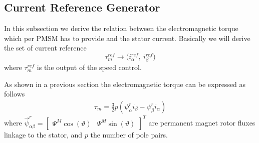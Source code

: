 \documentclass[11pt,a4paper]{scrartcl}
\numberwithin{equation}{section}
\theoremstyle{it}
\theoremstyle{definition}
\begin{document}
\begin{onehalfspace}
\subsection{Current Reference Generator}
In this subsection we derive the relation between the electromagnetic torque which per PMSM has to provide and the stator current. Basically we will derive the set of current reference
\begin{equation}\label{pmsm_problem_1_eq_17}
	\tau_m^{ref}\rightarrow \big(i_\alpha^{ref},\ i_\beta^{ref}\big)
\end{equation}
where $\tau_m^{ref}$ is the output of the speed control.

As shown in a previous section the electromagnetic torque can be expressed as 
follows
\begin{equation}\label{pmsm_problem_1_eq_18}
	\begin{aligned}
		\tau_m = \frac{3}{2}p\left( 
		\psi^r_{\alpha}i_{\beta}-\psi^r_{\beta}i_{\alpha}\right) 
	\end{aligned} 
\end{equation}
where $\vec{\psi}^r_{\alpha\beta} = \begin{bmatrix} \Psi^M\cos(\vartheta) &  
	\Psi^M\sin(\vartheta)\end{bmatrix}^T$ are permanent magnet rotor fluxes linkage to the stator, and $p$ the number of pole pairs.


\end{onehalfspace}
\end{document}
